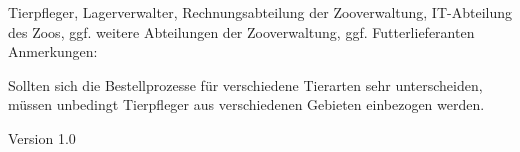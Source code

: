 %
{}{Tierpfleger, Lagerverwalter, Rechnungsabteilung der Zooverwaltung, IT-Abteilung des Zoos, ggf. weitere Abteilungen der Zooverwaltung, ggf. Futterlieferanten}%
{Anmerkungen:}{Sollten sich die Bestellprozesse für verschiedene Tierarten sehr unterscheiden, müssen unbedingt Tierpfleger aus verschiedenen Gebieten einbezogen werden.
\begin{flushright}
	\textnormal{\textsf{\footnotesize{Version 1.0}}}
\end{flushright}
}
{}%